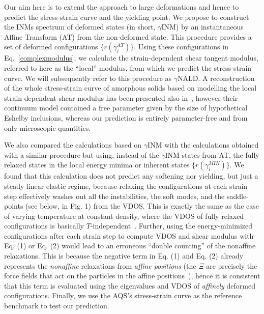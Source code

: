\documentclass[pre,twocolumn,aps,superscriptaddress,showpacs]{revtex4-1}
\begin{document}
Our aim here is to extend the approach to large deformations and hence to predict the stress-strain curve and the yielding point. We propose to construct the INMs spectrum of deformed states (in short, $\gamma$INM) by an instantaneous Affine Transform (AT) from the non-deformed state. This procedure provides a set of deformed configurations $\{r(\gamma^{AT}_i)\}$. Using these configurations in Eq.~\ref{complexmodulus}, we calculate the strain-dependent shear tangent modulus, referred to here as the ``local'' modulus, from which we predict the stress-strain curve. We will subsequently refer to this procedure as $\gamma$NALD. A reconstruction of the whole stress-strain curve of amorphous solids based on modelling the local strain-dependent shear modulus has been presented also in~\cite{Rodney2016}, however their continuum model contained a free parameter given by the size of hypothetical Eshelby inclusions, whereas our prediction is entirely parameter-free and from only microscopic quantities.

We also compared the calculations based on $\gamma$INM  with the calculations obtained with a similar procedure but using, instead of the $\gamma$INM states from AT, the fully relaxed states in the local energy minima or inherent states $\{r(\gamma^{MIN}_i)\}$. We found that this calculation does not predict any softening nor yielding, but just a steady linear elastic regime, because relaxing the configurations at each strain step effectively washes out all the instabilities, the soft modes, and the saddle-points (see below, in Fig. 1) from the VDOS. This is exactly the same as the case of varying temperature at constant density, where the VDOS of fully relaxed configurations is basically $T$-independent~\cite{Prediction2018}. 
Further, using the energy-minimized configurations after each strain step to compute VDOS and shear modulus with Eq. (1) or Eq. (2) would lead to an erroneous ``double counting'' of the nonaffine relaxations. This is because the negative term in Eq. (1) and Eq. (2) already represents the \emph{nonaffine} relaxations from \emph{affine positions} (the $\Xi$ are precisely the force fields that act on the particles in the affine positions~\cite{Lemaitre2006,Maloney}), hence it is consistent that this term is evaluated using the eigenvalues and VDOS of \emph{affinely} deformed configurations.  
Finally, we use the AQS's stress-strain curve as the reference benchmark to test our prediction.


\end{document}
